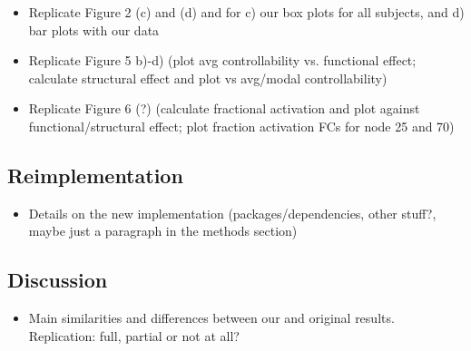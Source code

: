 \begin{itemize}
 \item 
  Replicate Figure 2 (c) and (d) 
  and for c) our box plots for all subjects, and d) bar plots with our data
  
 \item
  Replicate Figure 5 b)-d) (plot avg controllability vs. functional effect; calculate structural effect and plot vs avg/modal controllability)
  
 \item
  Replicate Figure 6 (?) (calculate fractional activation and plot against functional/structural effect; plot fraction activation FCs for node 25 and 70)
\end{itemize}






\subsection{Reimplementation}

\begin{itemize}
 \item 
  Details on the new implementation (packages/dependencies, other stuff?, maybe just a paragraph in the methods section) 
\end{itemize}

 




\subsection{Discussion}

\begin{itemize}
 \item 
  Main similarities and differences between our and original results. Replication: full, partial or not at all?
\end{itemize}
